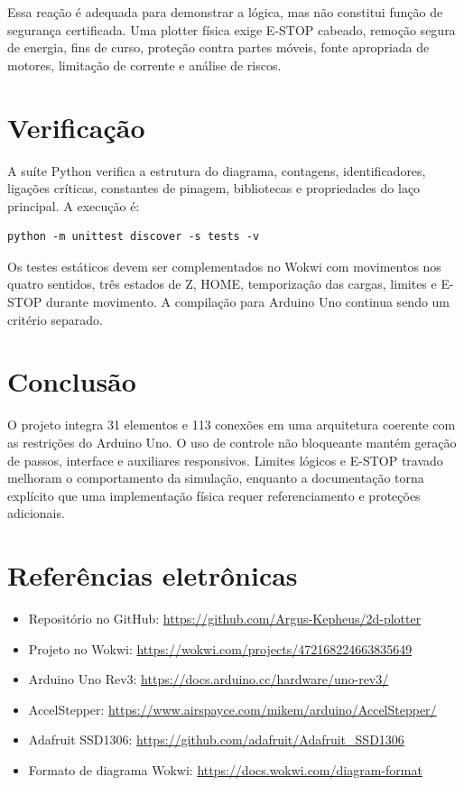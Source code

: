 \documentclass[12pt,a4paper]{article}
\newcommand{\WokwiURL}{https://wokwi.com/projects/472168224663835649}
\newcommand{\GitHubURL}{https://github.com/Argus-Kepheus/2d-plotter}
\begin{document}
Essa reação é adequada para demonstrar a lógica, mas não constitui função de
segurança certificada. Uma plotter física exige E-STOP cabeado, remoção segura
de energia, fins de curso, proteção contra partes móveis, fonte apropriada de
motores, limitação de corrente e análise de riscos.

\section{Verificação}

A suíte Python verifica a estrutura do diagrama, contagens, identificadores,
ligações críticas, constantes de pinagem, bibliotecas e propriedades do laço
principal. A execução é:

\begin{verbatim}
python -m unittest discover -s tests -v
\end{verbatim}

Os testes estáticos devem ser complementados no Wokwi com movimentos nos
quatro sentidos, três estados de Z, HOME, temporização das cargas, limites e
E-STOP durante movimento. A compilação para Arduino Uno continua sendo um
critério separado.

\section{Conclusão}

O projeto integra 31 elementos e 113 conexões em uma arquitetura coerente com
as restrições do Arduino Uno. O uso de controle não bloqueante mantém geração
de passos, interface e auxiliares responsivos. Limites lógicos e E-STOP travado
melhoram o comportamento da simulação, enquanto a documentação torna explícito
que uma implementação física requer referenciamento e proteções adicionais.

\section*{Referências eletrônicas}
\begin{itemize}
  \item Repositório no GitHub: \url{\GitHubURL}
  \item Projeto no Wokwi: \url{\WokwiURL}
  \item Arduino Uno Rev3: \url{https://docs.arduino.cc/hardware/uno-rev3/}
  \item AccelStepper: \url{https://www.airspayce.com/mikem/arduino/AccelStepper/}
  \item Adafruit SSD1306: \url{https://github.com/adafruit/Adafruit_SSD1306}
  \item Formato de diagrama Wokwi: \url{https://docs.wokwi.com/diagram-format}
\end{itemize}
\end{document}
